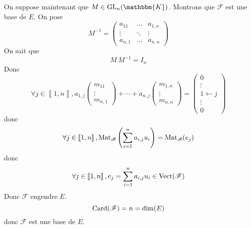 \begin{prv}
\begin{enumerate}
			On suppose maintenant que $M \in \mathrm{GL}_n(\mathbbm{K})$. Montrons que $\mathcal{F}$ est une base de $E$. On pose \[
				M^{-1} = \begin{pmatrix}
					a_{11}&\ldots&a_{1,n}\\
					\vdots&\ddots&\vdots\\
					a_{n,1}&\ldots&a_{n,n}
				\end{pmatrix}
			\]
			On sait que \[
				M\,M^{-1} = I_n
			\] Donc \[
				\forall j \in \left\llbracket 1,n \right\rrbracket,
				a_{1,j} \begin{pmatrix}
					m_{11}\\
					\vdots\\
					m_{n,1}
				\end{pmatrix} + \cdots +
				a_{n,j} \begin{pmatrix}
					m_{1,n}\\
					\vdots\\
					m_{n,n}
				\end{pmatrix} = \begin{pmatrix}
					0\\
					\vdots\\
					1 \leftarrow j\\
					\vdots\\
					0
				\end{pmatrix}
			\] donc \[
				\forall j \in \left\llbracket 1,n \right\rrbracket, \operatorname{Mat}_\mathcal{B}\left( \sum_{i=1}^n a_{i,j} u_i \right) = \operatorname{Mat}_\mathcal{B}(e_j)
			\] donc \[
				\forall j \in \left\llbracket 1,n \right\rrbracket,
				e_j = \sum_{i=1}^n a_{i,j} u_i \in \operatorname{Vect}(\mathcal{F})
			\]
			Donc $\mathcal{F}$ engendre $E$. \[
				\operatorname{Card}(\mathcal{F}) = n = \dim(E)
			\] donc $\mathcal{F}$ est une base de $E$.
	\end{enumerate}
\end{prv}
